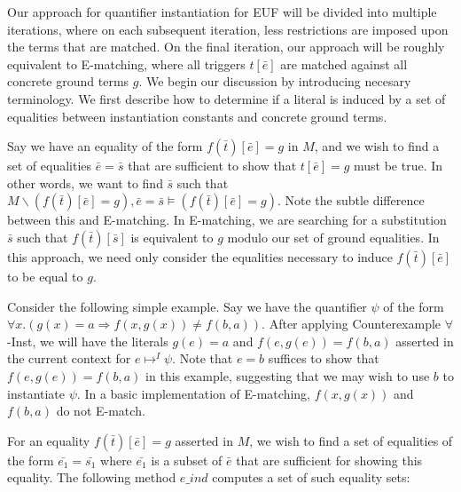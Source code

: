 \documentclass{llncs}
\begin{document}
Our approach for quantifier instantiation for EUF will be divided into multiple iterations, where on each subsequent iteration, less restrictions are imposed upon the terms that are matched.
On the final iteration, our approach will be roughly equivalent to E-matching, where all triggers $t[\bar{e}]$ are matched against all concrete ground terms $g$.
We begin our discussion by introducing necesary terminology.
We first describe how to determine if a literal is induced by a set of equalities between instantiation constants and concrete ground terms.

Say we have an equality of the form $f( \bar{t} )[\bar{e}] = g$ in $M$, and we wish to find a set of equalities $\bar{e} = \bar{s}$ that are sufficient to show that $t[\bar{e}] = g$ must be true.
In other words, we want to find $\bar{s}$ such that $M \backslash (f( \bar{t} )[\bar{e}] = g), \bar{e} = \bar{s} \models (f( \bar{t} )[\bar{e}] = g)$.
Note the subtle difference between this and E-matching.
In E-matching, we are searching for a substitution $\bar{s}$ such that $f( \bar{t} )[\bar{s}]$ is equivalent to $g$ modulo our set of ground equalities.
In this approach, we need only consider the equalities necessary to induce $f( \bar{t} )[\bar{e}]$ to be equal to $g$.

Consider the following simple example.
Say we have the quantifier $\psi$ of the form $\forall x. (g(x) = a \Rightarrow f( x, g( x ) ) \neq f( b, a ))$.
After applying Counterexample $\forall$-Inst, we will have the literals $g(e) = a$ and $f( e, g( e ) ) = f( b, a )$ asserted in the current context for $e \mapsto^I \psi$.
Note that $e = b$ suffices to show that $f( e, g( e ) ) = f( b, a )$ in this example, suggesting that we may wish to use $b$ to instantiate $\psi$.
In a basic implementation of E-matching, $f( x, g( x ) )$ and $f( b, a )$ do not E-match.

For an equality $f( \bar{t} )[\bar{e}] = g$ asserted in $M$, we wish to find a set of equalities of the form $\bar{e_1} = \bar{s_1}$ where $\bar{e_1}$ is a subset of $\bar{e}$ that are sufficient for showing this equality.
The following method $e\_ind$ computes a set of such equality sets:
\end{document}
